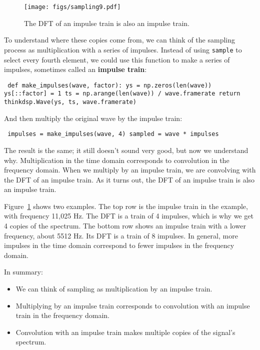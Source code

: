 \documentclass[12pt]{book} \usepackage[width=5.5in,height=8.5in, hmarginratio=3:2,vmarginratio=1:1]{geometry}
\begin{document}
\begin{figure} 

\centerline{\texttt{[image: figs/sampling9.pdf]}} \caption{The DFT of an impulse train is also an impulse train.} \label{fig.sampling9} \end{figure} 

To understand where these copies come from, we can think of the sampling process as multiplication with a series of impulses. Instead of using {\tt sample} to select every fourth element, we could use this function to make a series of impulses, sometimes called an {\bf impulse train}: 

\begin{verbatim} def make_impulses(wave, factor): ys = np.zeros(len(wave)) ys[::factor] = 1 ts = np.arange(len(wave)) / wave.framerate return thinkdsp.Wave(ys, ts, wave.framerate) \end{verbatim} 

And then multiply the original wave by the impulse train: 

\begin{verbatim} impulses = make_impulses(wave, 4) sampled = wave * impulses \end{verbatim} 

The result is the same; it still doesn't sound very good, but now we understand why. Multiplication in the time domain corresponds to convolution in the frequency domain. When we multiply by an impulse train, we are convolving with the DFT of an impulse train. As it turns out, the DFT of an impulse train is also an impulse train. 

Figure~\ref{fig.sampling9} shows two examples. The top row is the impulse train in the example, with frequency 11,025 Hz. The DFT is a train of 4 impulses, which is why we get 4 copies of the spectrum. The bottom row shows an impulse train with a lower frequency, about 5512 Hz. Its DFT is a train of 8 impulses. In general, more impulses in the time domain correspond to fewer impulses in the frequency domain. 

In summary: 

\begin{itemize} 

\item We can think of sampling as multiplication by an impulse train. 

\item Multiplying by an impulse train corresponds to convolution with an impulse train in the frequency domain. 

\item Convolution with an impulse train makes multiple copies of the signal's spectrum. 

\end{itemize} 
\end{document}
